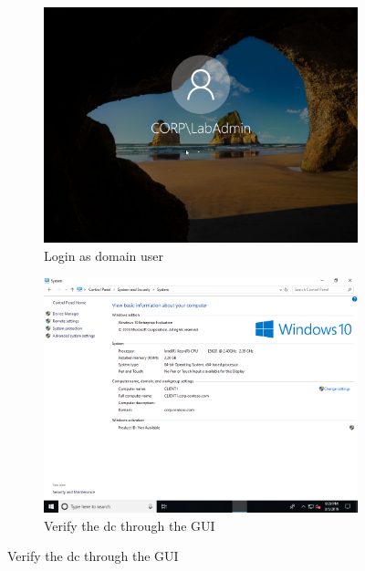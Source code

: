 \begin{figure}[h]
	\begin{subfigure}{0.5\textwidth}
		\captionsetup{width=0.8\linewidth}
		\includegraphics[width=0.9\linewidth]{img/Methodologie/Prerequisites1.png}
		\centering
		\caption{Login as domain user}
	\end{subfigure}
	\begin{subfigure}{0.5\textwidth}
		\captionsetup{width=0.8\linewidth}
		\includegraphics[width=0.9\linewidth]{img/Methodologie/Prerequisites2.png} 
		\centering
		\caption{Verify the \acrshort{dc} through the GUI}
	\end{subfigure}
\end{figure}
